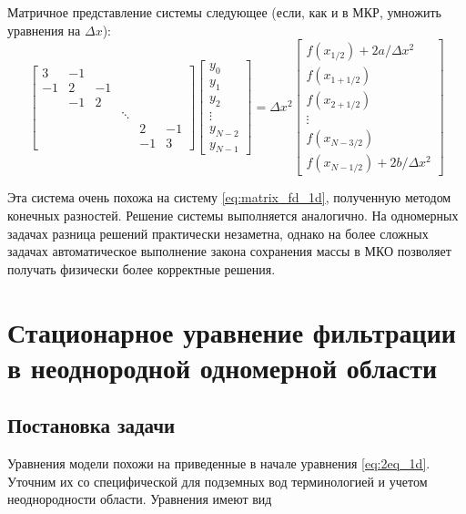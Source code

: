 \documentclass[a4paper, 11pt]{article}
\begin{document}
Матричное представление системы следующее (если, как и в МКР, умножить уравнения на $\Delta x$):
\begin{equation}
	\begin{bmatrix}
		3  & -1 &   &       \\
		-1 &  2 & -1 \\
		& -1 &  2 \\
		&    &   & \ddots \\
		&    &   &       &  2 & -1\\
		&    &   &       & -1 & 3
		
	\end{bmatrix}
	\begin{bmatrix}
		y_0 \\ y_1 \\ y_2 \\ \vdots \\y_{N-2} \\ y_{N-1}
	\end{bmatrix}
	=
	\Delta x^2 
	\begin{bmatrix}
		f(x_{1/2}) + 2a/\Delta x^2 \\
		f(x_{1+1/2})\\
		f(x_{2+1/2})\\
		\vdots\\
		f(x_{N-3/2})\\
		f(x_{N-1/2}) + 2b/\Delta x^2 
	\end{bmatrix}
\end{equation}

Эта система очень похожа на систему \eqref{eq:matrix_fd_1d}, полученную методом конечных разностей. Решение системы выполняется аналогично. На одномерных задачах 
разница решений практически незаметна, однако на более сложных задачах автоматическое выполнение закона сохранения массы в МКО позволяет получать физически более
корректные решения.

\section{Стационарное уравнение фильтрации в неоднородной одномерной области}
\subsection{Постановка задачи}
Уравнения модели похожи на приведенные в начале уравнения \eqref{eq:2eq_1d}. Уточним их со специфической для подземных вод терминологией и учетом неоднородности области. Уравнения имеют вид
\end{document}
